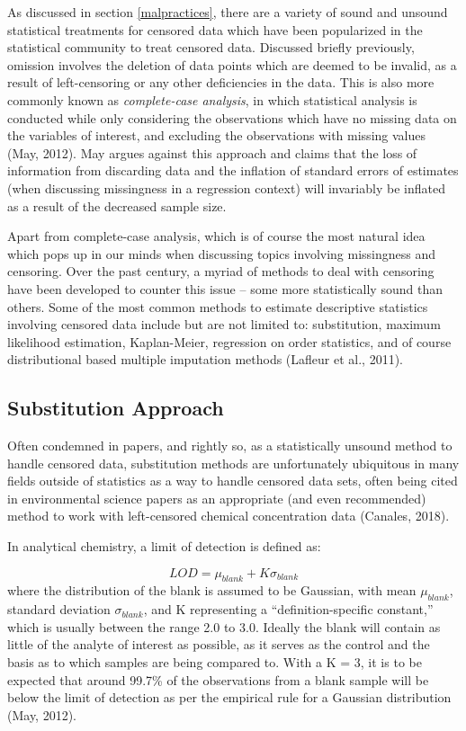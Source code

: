 \documentclass[12pt, twoside]{amherstthesis}
\begin{document}
As discussed in section \ref{malpractices}, there are a variety of sound and unsound statistical treatments for censored data which have been popularized in the statistical community to treat censored data. Discussed briefly previously, omission involves the deletion of data points which are deemed to be invalid, as a result of left-censoring or any other deficiencies in the data. This is also more commonly known as \emph{complete-case analysis}, in which statistical analysis is conducted while only considering the observations which have no missing data on the variables of interest, and excluding the observations with missing values (May, 2012). May argues against this approach and claims that the loss of information from discarding data and the inflation of standard errors of estimates (when discussing missingness in a regression context) will invariably be inflated as a result of the decreased sample size.

Apart from complete-case analysis, which is of course the most natural idea which pops up in our minds when discussing topics involving missingness and censoring. Over the past century, a myriad of methods to deal with censoring have been developed to counter this issue -- some more statistically sound than others. Some of the most common methods to estimate descriptive statistics involving censored data include but are not limited to: substitution, maximum likelihood estimation, Kaplan-Meier, regression on order statistics, and of course distributional based multiple imputation methods (Lafleur et al., 2011).

\hypertarget{Substitution}{%
\subsection{Substitution Approach}\label{Substitution}}

Often condemned in papers, and rightly so, as a statistically unsound method to handle censored data, substitution methods are unfortunately ubiquitous in many fields outside of statistics as a way to handle censored data sets, often being cited in environmental science papers as an appropriate (and even recommended) method to work with left-censored chemical concentration data (Canales, 2018).

In analytical chemistry, a limit of detection is defined as:

\[LOD = \mu_{blank} + K\sigma_{blank}\]
where the distribution of the blank is assumed to be Gaussian, with mean \(\mu_{blank}\), standard deviation \(\sigma_{blank}\), and K representing a ``definition-specific constant,'' which is usually between the range 2.0 to 3.0. Ideally the blank will contain as little of the analyte of interest as possible, as it serves as the control and the basis as to which samples are being compared to. With a K = 3, it is to be expected that around 99.7\% of the observations from a blank sample will be below the limit of detection as per the empirical rule for a Gaussian distribution (May, 2012).
\end{document}
